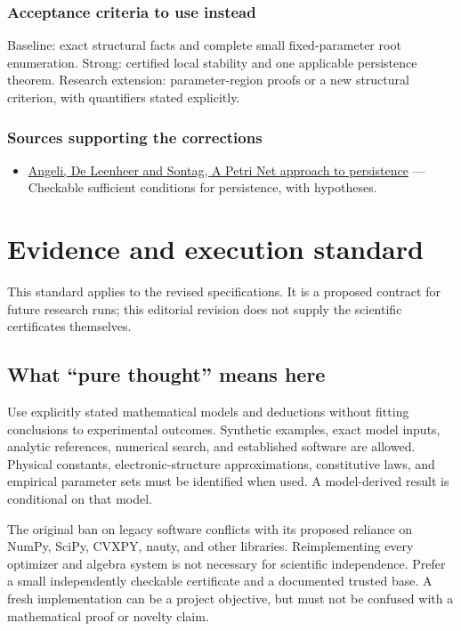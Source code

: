\documentclass[
  11pt,
]{article}
\providecommand{\tightlist}{%
  \setlength{\itemsep}{0pt}\setlength{\parskip}{0pt}}
\begin{document}
\subsubsection{Acceptance criteria to use instead}

Baseline: exact structural facts and complete small fixed-parameter root
enumeration. Strong: certified local stability and one applicable
persistence theorem. Research extension: parameter-region proofs or a
new structural criterion, with quantifiers stated explicitly.

\subsubsection{Sources supporting the corrections}

\begin{itemize}
\tightlist
\item
  \href{https://arxiv.org/abs/q-bio/0608019}{Angeli, De Leenheer and
  Sontag, A Petri Net approach to persistence} --- Checkable sufficient
  conditions for persistence, with hypotheses.
\end{itemize}

\section{Evidence and execution standard}

This standard applies to the revised specifications. It is a proposed
contract for future research runs; this editorial revision does not
supply the scientific certificates themselves.

\subsection{What ``pure thought'' means here}

Use explicitly stated mathematical models and deductions without fitting
conclusions to experimental outcomes. Synthetic examples, exact model
inputs, analytic references, numerical search, and established software
are allowed. Physical constants, electronic-structure approximations,
constitutive laws, and empirical parameter sets must be identified when
used. A model-derived result is conditional on that model.

The original ban on legacy software conflicts with its proposed reliance
on NumPy, SciPy, CVXPY, nauty, and other libraries. Reimplementing every
optimizer and algebra system is not necessary for scientific
independence. Prefer a small independently checkable certificate and a
documented trusted base. A fresh implementation can be a project
objective, but must not be confused with a mathematical proof or novelty
claim.
\end{document}
